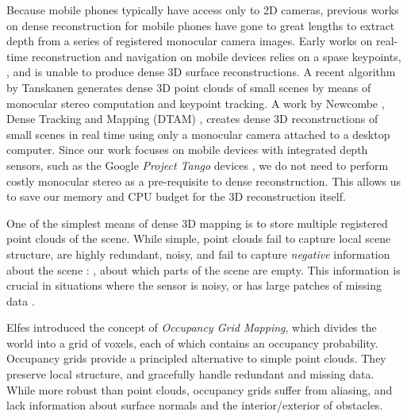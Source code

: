 \documentclass[10pt,twocolumn,letterpaper]{article}
\begin{document}
Because mobile phones typically have access only to 2D cameras, previous works
on dense reconstruction for mobile phones have gone to great lengths to extract
depth from a series of registered monocular camera images.  Early works on
real-time reconstruction and navigation on mobile devices relies on a spase
keypoints, \cite{KleinSparse}, and is unable to produce dense 3D surface
reconstructions.  A recent algorithm by Tanskanen \etal
\cite{TanskanenMetric} generates dense 3D point clouds of small scenes
by means of monocular stereo computation and keypoint tracking. 
 A work by Newcombe \etal, Dense Tracking and Mapping (DTAM) \cite{DTAM}, 
 creates dense 3D reconstructions of small scenes in real time using only a
 monocular camera attached to a desktop computer. Since our work focuses on
 mobile devices with integrated depth sensors, such as the Google \emph{Project Tango}
 devices \cite{Tango}, we do not need to perform costly monocular stereo as a
 pre-requisite to dense reconstruction. This allows us to save our memory and
 CPU budget for the 3D reconstruction itself.

One of the simplest means of dense 3D mapping is to  store multiple registered
point clouds of the scene. While simple, point clouds fail to capture local
scene structure, are highly redundant, noisy, and fail to capture
\emph{negative} information about the scene :  \ie, about which parts of
the scene are empty. This information is crucial in situations where the sensor
is noisy, or has large patches of missing data \cite{Klingensmith2014}.

Elfes \cite{Elfes1989} introduced the concept of \emph{Occupancy Grid
Mapping}, which divides the world into a grid of voxels, each of which contains
an occupancy probability. Occupancy grids provide a principled alternative to
simple point clouds. They preserve local structure, and gracefully handle
redundant and missing data.  While more robust than point clouds, occupancy
grids suffer from aliasing, and lack information about surface normals and the
interior/exterior of obstacles.

\end{document}
